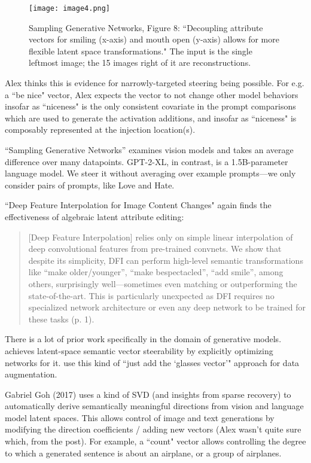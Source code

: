 \documentclass[10pt]{article}
\begin{document}
\begin{figure}[h]
	\texttt{[image: image4.png]}
\caption{Sampling Generative Networks, Figure 8: ``Decoupling attribute vectors for smiling (x-axis) and mouth open (y-axis) allows for more flexible latent space transformations." The input is the single leftmost image; the 15 images right of it are reconstructions.}
\label{fig:image4}
\end{figure}

Alex thinks this is evidence for narrowly-targeted steering being possible. For e.g. a ``be nice" vector, Alex expects the vector to not change other model behaviors insofar as ``niceness" is the only consistent covariate in the prompt comparisons which are used to generate the activation additions, and insofar as ``niceness" is composably represented at the injection location(s).

``Sampling Generative Networks'' examines vision models and takes an average difference over many datapoints. GPT-2-XL, in contrast, is a 1.5B-parameter language model. We steer it without averaging over example prompts—we only consider pairs of prompts, like Love and Hate. 

\citet{8100128} ``Deep Feature Interpolation for Image Content Changes" again finds the effectiveness of algebraic latent attribute editing:

\begin{quote}
[Deep Feature Interpolation] relies only on simple linear interpolation of deep convolutional features from pre-trained convnets. We show that despite its simplicity, DFI can perform high-level semantic transformations like “make older/younger”, “make bespectacled”, “add smile”, among others, surprisingly well—sometimes even matching or outperforming the state-of-the-art. This is particularly unexpected as DFI requires no specialized network architecture or even any deep network to be trained for these tasks (p. 1).
\end{quote}

There is a lot of prior work specifically in the domain of generative models. \citet{NIPS2015_e0741335} achieves latent-space semantic vector steerability by explicitly optimizing networks for it. \citet{NEURIPS2019_15f99f21} use this kind of ``just add the `glasses vector'" approach for data augmentation. 

Gabriel Goh (2017) uses a kind of SVD (and insights from sparse recovery) to automatically derive semantically meaningful directions from vision and language model latent spaces. This allows control of image and text generations by modifying the direction coefficients / adding new vectors (Alex wasn't quite sure which, from the post). For example, a ``count" vector allows controlling the degree to which a generated sentence is about an airplane, or a group of airplanes. 
\end{document}

